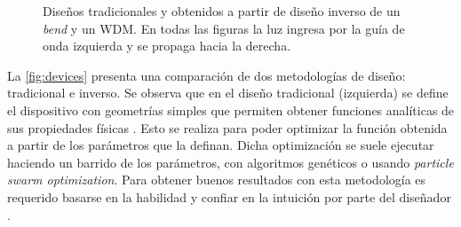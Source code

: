 \begin{figure}[ht]
  \hfill

  \caption{Diseños tradicionales y obtenidos a partir de diseño inverso de un
  \emph{bend} y un WDM. 
  En todas las figuras la luz ingresa por la guía de onda izquierda y se propaga hacia la derecha.}
  \label{fig:devices}

\end{figure}



La \autoref{fig:devices} presenta una comparación de dos metodologías de diseño: tradicional e inverso.
Se observa que en el diseño tradicional (izquierda) se define el dispositivo con geometrías simples que permiten obtener funciones analíticas de sus propiedades físicas \citep{Hughes2016, Song2008}. 
Esto se realiza para poder optimizar la función obtenida a partir de los parámetros que la definan. 
Dicha optimización se suele ejecutar haciendo un barrido de los parámetros, con algoritmos genéticos o usando \emph{particle swarm optimization}.
Para obtener buenos resultados con esta metodología es requerido basarse en la habilidad y confiar en la intuición por parte del diseñador \citep{Su2020}. 

